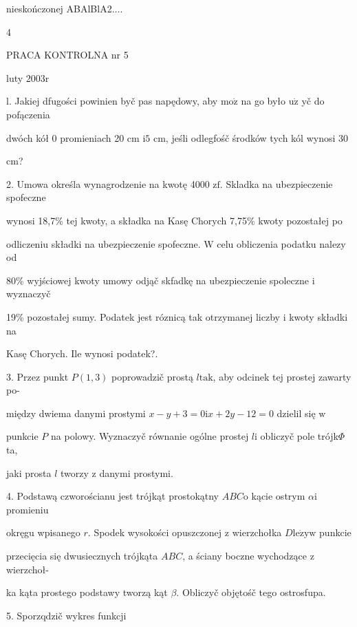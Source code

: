 \documentclass[a4paper,12pt]{article}
\begin{document}
nieskończonej ABAlBlA2$\ldots.$

4





PRACA KONTROLNA nr 5

luty $2003\mathrm{r}$

l. Jakiej dfugości powinien byč pas napędowy, aby $\mathrm{m}\mathrm{o}\dot{\mathrm{z}}$ na go było $\mathrm{u}\dot{\mathrm{z}}$ yč do pofączenia

dwóch kół $0$ promieniach 20 cm $\mathrm{i}5$ cm, jeśli odlegfośč środków tych kól wynosi 30

cm?

2. Umowa określa wynagrodzenie na kwotę 4000 $\mathrm{z}\mathrm{f}$. Skladka na ubezpieczenie spofeczne

wynosi 18,7\% tej kwoty, a składka na Kasę Chorych 7,75\% kwoty pozostałej po

odliczeniu składki na ubezpieczenie spofeczne. $\mathrm{W}$ celu obliczenia podatku nalezy od

80\% wyjściowej kwoty umowy odjąč skfadkę na ubezpieczenie spoleczne $\mathrm{i}$ wyznaczyč

19\% pozostałej sumy. Podatek jest róznicą tak otrzymanej liczby $\mathrm{i}$ kwoty składki na

Kasę Chorych. Ile wynosi podatek?.

3. Przez punkt $P(1,3)$ poprowadzič prostą $l\mathrm{t}\mathrm{a}\mathrm{k}$, aby odcinek tej prostej zawarty po-

między dwiema danymi prostymi $x-y+3 = 0 \mathrm{i}x+2y-12 = 0$ dzielil się $\mathrm{w}$

punkcie $P$ na polowy. Wyznaczyč równanie ogólne prostej $l\mathrm{i}$ obliczyč pole trójk$\Phi$ta,

jaki prosta $l$ tworzy $\mathrm{z}$ danymi prostymi.

4. Podstawą czworościanu jest trójkąt prostokątny $ABC\mathrm{o}$ kącie ostrym $\alpha \mathrm{i}$ promieniu

okręgu wpisanego $r$. Spodek wysokości opuszczonej $\mathrm{z}$ wierzchołka $D\mathrm{l}\mathrm{e}\dot{\mathrm{z}}\mathrm{y}\mathrm{w}$ punkcie

przecięcia się dwusiecznych trójkąta $ABC$, a ściany boczne wychodzące $\mathrm{z}$ wierzchoł-

ka kąta prostego podstawy tworzą kąt $\beta$. Obliczyč objętośč tego ostrosfupa.

5. Sporzqdzič wykres funkcji
\end{document}
